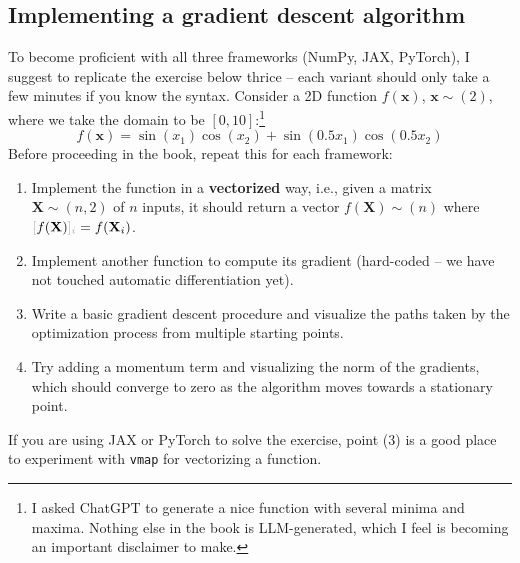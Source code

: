 \subsection*{Implementing a gradient descent algorithm}

To become proficient with all three frameworks (NumPy, JAX, PyTorch), I suggest to replicate the exercise below thrice -- each variant should only take a few minutes if you know the syntax.  Consider a 2D function $f(\mathbf{x})$, $\mathbf{x} \sim (2)$, where we take the domain to be $[0,10]$:\footnote{I asked ChatGPT to generate a nice function with several minima and maxima. Nothing else in the book is LLM-generated, which I feel is becoming an important disclaimer to make.}
%
\begin{equation*}
    f(\mathbf{x}) = \sin(x_1) \cos(x_2) + \sin(0.5x_1) \cos(0.5x_2)
\end{equation*}
%
Before proceeding in the book, repeat this for each framework:
%
\begin{enumerate}
\item Implement the function in a \textbf{vectorized} way, i.e., given a matrix $\mathbf{X} \sim (n,2)$ of $n$ inputs, it should return a vector $f(\mathbf{X}) \sim (n)$ where $\idx{f(\mathbf{X})}{i} = f(\mathbf{X}_i)$.
\item Implement another function to compute its gradient (hard-coded -- we have not touched automatic differentiation yet).
\item Write a basic gradient descent procedure and visualize the paths taken by the optimization process from multiple starting points.
\item Try adding a momentum term and visualizing the norm of the gradients, which should converge to zero as the algorithm moves towards a stationary point.
\end{enumerate}
%
If you are using JAX or PyTorch to solve the exercise, point (3) is a good place to experiment with \texttt{vmap} for vectorizing a function.